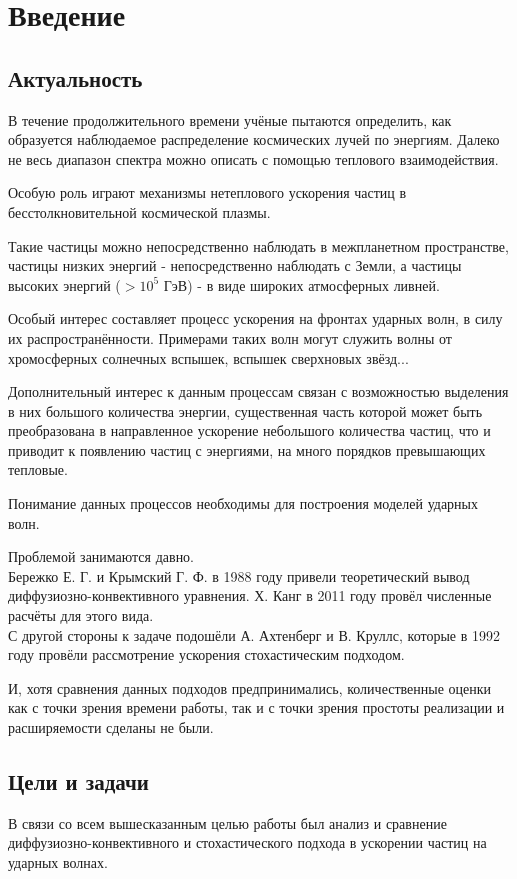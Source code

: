 \documentclass[a4paper,11pt]{article} %
\begin{document}
\tableofcontents
\newpage
\section{Введение}
\subsection{Актуальность}
В течение продолжительного времени учёные пытаются определить, как образуется наблюдаемое распределение космических лучей по энергиям. Далеко не весь диапазон спектра можно описать с помощью теплового взаимодействия.

Особую роль играют механизмы нетеплового ускорения частиц в бесстолкновительной космической плазмы. 

Такие частицы можно непосредственно наблюдать в межпланетном пространстве, частицы низких энергий - непосредственно наблюдать с Земли, а частицы высоких энергий ($>10^5$ ГэВ) - в виде широких атмосферных ливней.

Особый интерес составляет процесс ускорения на фронтах ударных волн, в силу их распространённости.
Примерами таких волн могут служить волны от хромосферных солнечных вспышек, вспышек сверхновых звёзд...

Дополнительный интерес к данным процессам связан с возможностью выделения в них большого количества энергии, существенная часть которой может быть преобразована в направленное ускорение небольшого количества частиц, что и приводит к появлению частиц с энергиями, на много порядков превышающих тепловые.

Понимание данных процессов необходимы для построения моделей ударных волн.

Проблемой занимаются давно.\\
 Бережко Е. Г. и Крымский Г. Ф. в 1988 году привели теоретический вывод диффузиозно-конвективного уравнения. Х. Канг в 2011 году провёл численные расчёты для этого вида. \\ 
С другой стороны к задаче подошёли А. Ахтенберг и В. Круллс, которые в 1992 году провёли рассмотрение ускорения стохастическим подходом. 

И, хотя сравнения данных подходов предпринимались, количественные оценки как с точки зрения времени работы, так и с точки зрения простоты реализации и расширяемости сделаны не были.

\subsection{Цели и задачи}
В связи со всем вышесказанным целью работы был анализ и сравнение диффузиозно-конвективного и стохастического подхода в ускорении частиц на ударных волнах.
\end{document}
